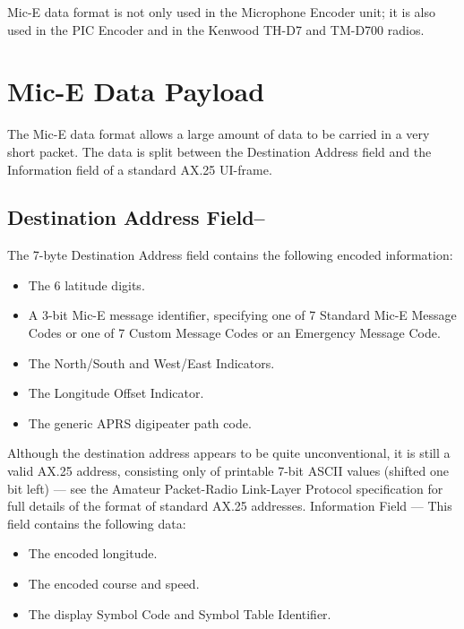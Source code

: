 {{{{{Mic-E data format is not only used in the Microphone Encoder unit; it is also
used in the PIC Encoder and in the Kenwood TH-D7 and TM-D700 radios.

\section{Mic-E Data Payload}

The Mic-E data format allows a large amount of data to be carried in a very
short packet. The data is split between the Destination Address field and the
Information field of a standard AX.25 UI-frame.

\subsection{Destination Address Field--} The 7-byte Destination Address field contains
the following encoded information:

\begin {itemize}
\item The 6 latitude digits.

\item A 3-bit Mic-E message identifier, specifying one of 7 Standard Mic-E
Message Codes or one of 7 Custom Message Codes or an Emergency
Message Code.

\item The North/South and West/East Indicators.

\item The Longitude Offset Indicator.

\item The generic APRS digipeater path code.
\end{itemize}

Although the destination address appears to be quite unconventional, it is
still a valid AX.25 address, consisting only of printable 7-bit ASCII values
(shifted one bit left) — see the Amateur Packet-Radio Link-Layer Protocol
specification for full details of the format of standard AX.25 addresses.
Information Field — This field contains the following data:


\begin{itemize}
  
\item The encoded longitude.

\item The encoded course and speed.

\item The display Symbol Code and Symbol Table Identifier.


\end{itemize}}}}}}
